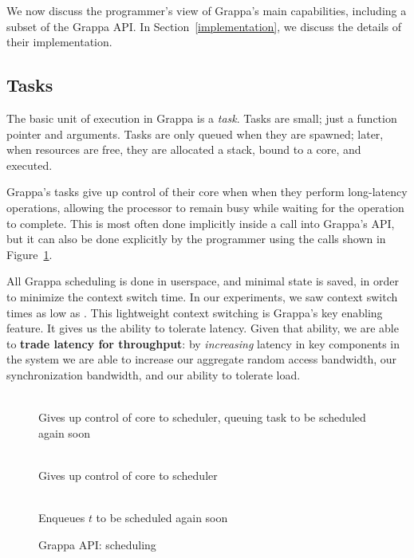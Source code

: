 We now discuss the
programmer's view of Grappa's main capabilities, including a subset of
the Grappa API. In Section~\ref{implementation}, we discuss the details
of their implementation.


\subsection{Tasks}


The basic unit of execution in Grappa is a {\em task}. Tasks are
small; just a function pointer and arguments. Tasks are only
queued when they are spawned; later, when resources are free, they are
allocated a stack, bound to a core, and executed.

Grappa's tasks give up control of their core when when they perform
long-latency operations, allowing the processor to remain busy while
waiting for the operation to complete. This is most often done
implicitly inside a call into Grappa's API, but it can also be done
explicitly by the programmer using the calls shown in
Figure~\ref{fig:scheduling}. 

All Grappa scheduling is done in userspace, and minimal state is saved,
in order to minimize the context switch time. In our experiments, we saw
context switch times as low as . This lightweight context
switching is Grappa's key enabling feature. It gives us the ability to
tolerate latency. Given that ability, we are able to \textbf{trade
latency for throughput}: by {\em increasing} latency in key components
in the system we are able to increase our aggregate random access
bandwidth, our synchronization bandwidth, and our ability to tolerate
load.

\begin{figure}[htbp]
  \begin{center}
    \begin{description}\small
    \item[ \texttt{ yield() } ] \hfill \\
      Gives up control of core to scheduler, queuing task to be scheduled again soon
    \item[ \texttt{ suspend() } ] \hfill \\
      Gives up control of core to scheduler
    \item[ \texttt{ wake( task * $t$ ) } ] \hfill \\
      Enqueues $t$ to be scheduled again soon
    \end{description}
    \begin{minipage}{0.95\columnwidth}
      \caption{\label{fig:scheduling} Grappa API: scheduling} %
    \end{minipage}
  \end{center}
\end{figure}


